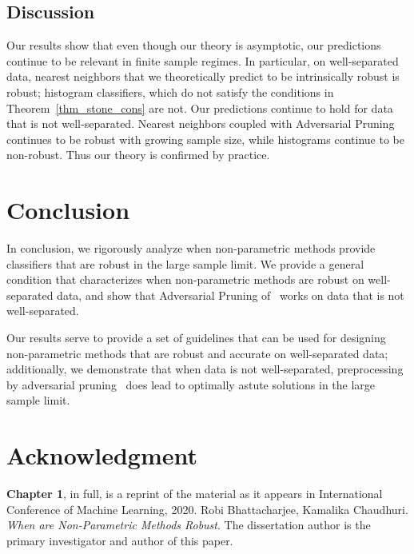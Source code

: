 \subsection{Discussion}

Our results show that even though our theory is asymptotic, our predictions continue to be relevant in finite sample regimes. In particular, on well-separated data, nearest neighbors that we theoretically predict to be intrinsically robust is robust; histogram classifiers, which do not satisfy the conditions in Theorem~\ref{thm_stone_cons} are not. Our predictions continue to hold for data that is not well-separated. Nearest neighbors coupled with Adversarial
Pruning continues to be robust with growing sample size, while histograms continue to be non-robust. Thus our theory is confirmed by practice.

\section{Conclusion}

In conclusion, we rigorously analyze when non-parametric methods provide classifiers that are robust in the large sample limit. We provide a general condition that characterizes when non-parametric methods are robust on well-separated data, and show that Adversarial Pruning of~\cite{YRWC19} works on data that is not well-separated. 

Our results serve to provide a set of guidelines that can be used for designing non-parametric methods that are robust and accurate on well-separated data; additionally, we demonstrate that when data is not well-separated, preprocessing by adversarial pruning~\cite{YRWC19} does lead to optimally astute solutions in the large sample limit. 

\section{Acknowledgment}

\textbf{Chapter 1}, in full, is a reprint of the material as it appears in International Conference of Machine Learning, 2020. Robi Bhattacharjee, Kamalika Chaudhuri. \emph{When are Non-Parametric Methods Robust}. The dissertation author is the primary investigator and author of this paper. 




%
%
%
%
%
%
%